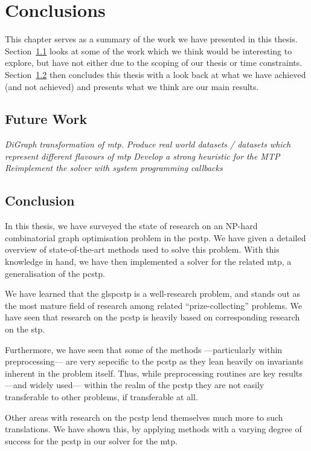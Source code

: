 {}
\chapter{Conclusions}
This chapter serves as a summary of the work we have presented in this thesis.
Section~\ref{sec:con:fut} looks at some of the work which we think would be
interesting to explore, but have not either due to the scoping of our thesis or
time constraints.
Section~\ref{sec:con:con} then concludes this thesis with a look back at what we
have achieved (and not achieved) and presents what we think are our main results.
\section{Future Work}\label{sec:con:fut}
\textit{DiGraph transformation of \gls{mtp}.}
\textit{Produce real world datasets / datasets which represent different flavours of mtp}
\textit{Develop a strong heuristic for the MTP}
\textit{Reimplement the solver with system programming callbacks}

\section{Conclusion}\label{sec:con:con}
In this thesis, we have surveyed the state of research on
an NP-hard combinatorial graph optimisation problem in
the \acrlong{pcstp}. We have given a detailed overview of state-of-the-art
methods used to solve this problem.
With this knowledge in hand, we have then implemented a solver for the related
\acrlong{mtp}, a generalisation of the \gls{pcstp}.

We have learned that the gls{pcstp}
is a well-research problem, and stands out as the most mature field of
research among related ``prize-collecting'' problems.
We have seen that research on the \gls{pcstp} is heavily based on corresponding
research on the \gls{stp}.

Furthermore, we have seen that some of the methods
---particularly within preprocessing---
are very sepecific to the \gls{pcstp} as they lean heavily on
invariants inherent in the problem itself. Thus, while preprocessing routines
are key results ---and widely used--- within the realm of the \gls{pcstp}
they are not easily transferable to other problems, if transferable at all.

Other areas with research on the \gls{pcstp} lend themselves much more to such
translations. We have shown this, by applying methods
with a varying degree of success for the
\gls{pcstp} in our solver for the \gls{mtp}.

